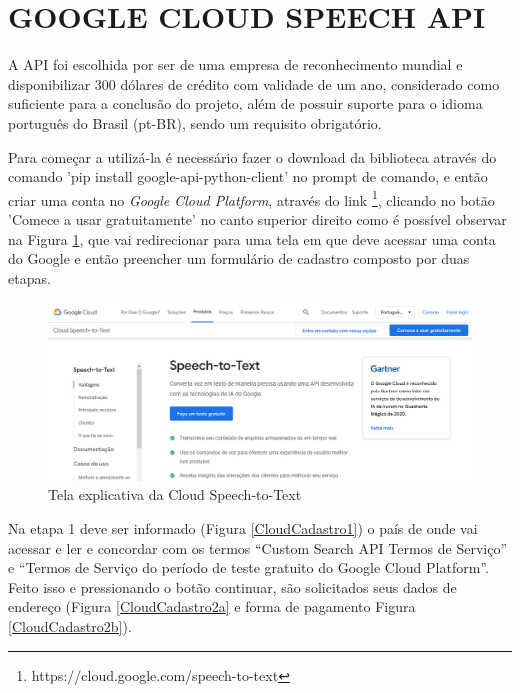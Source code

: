 \section{GOOGLE CLOUD SPEECH API}

A API foi escolhida por ser de uma empresa de  reconhecimento mundial e disponibilizar 300 dólares de crédito com validade de um ano, considerado como suficiente para a conclusão do projeto, além de possuir suporte para o idioma português do Brasil (pt-BR), sendo um requisito obrigatório.

Para começar a utilizá-la é necessário fazer o download da biblioteca através do comando 'pip install google-api-python-client' no prompt de comando, e então criar uma conta no \emph{Google Cloud Platform}, através do link \footnote{https://cloud.google.com/speech-to-text}, clicando no botão 'Comece a usar gratuitamente' no canto superior direito como é possível observar na Figura \ref{Cloudexplicação}, que vai redirecionar para uma tela em que deve acessar uma conta do Google e então preencher um formulário de cadastro composto por duas etapas. 


\begin{figure}[h!]
\centering
\caption{Tela explicativa da Cloud Speech-to-Text}
\label{Cloudexplicação}
\includegraphics[width=140mm]{images/ConfigurarGoogle/Google_TelaInicial.PNG}
\end{figure}


Na etapa 1 deve ser informado (Figura \ref{CloudCadastro1}) o país de onde vai acessar e ler e concordar com os termos ``Custom Search API Termos de Serviço'' e ``Termos de Serviço do período de teste gratuito do Google Cloud Platform''. Feito isso e pressionando o botão continuar, são solicitados seus dados de endereço (Figura \ref{CloudCadastro2a} e forma de pagamento Figura \ref{CloudCadastro2b}).

